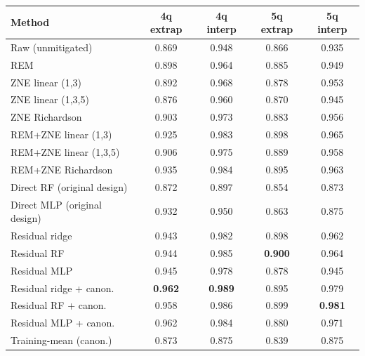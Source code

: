 \begin{tabular}{lcccc}
\toprule
Method & 4q extrap & 4q interp & 5q extrap & 5q interp \\
\midrule
Raw (unmitigated) & 0.869 & 0.948 & 0.866 & 0.935 \\
REM & 0.898 & 0.964 & 0.885 & 0.949 \\
ZNE linear (1,3) & 0.892 & 0.968 & 0.878 & 0.953 \\
ZNE linear (1,3,5) & 0.876 & 0.960 & 0.870 & 0.945 \\
ZNE Richardson & 0.903 & 0.973 & 0.883 & 0.956 \\
REM+ZNE linear (1,3) & 0.925 & 0.983 & 0.898 & 0.965 \\
REM+ZNE linear (1,3,5) & 0.906 & 0.975 & 0.889 & 0.958 \\
REM+ZNE Richardson & 0.935 & 0.984 & 0.895 & 0.963 \\
\midrule

Direct RF (original design) & 0.872 & 0.897 & 0.854 & 0.873 \\
Direct MLP (original design) & 0.932 & 0.950 & 0.863 & 0.875 \\
Residual ridge & 0.943 & 0.982 & 0.898 & 0.962 \\
Residual RF & 0.944 & 0.985 & \textbf{0.900} & 0.964 \\
Residual MLP & 0.945 & 0.978 & 0.878 & 0.945 \\
Residual ridge + canon. & \textbf{0.962} & \textbf{0.989} & 0.895 & 0.979 \\
Residual RF + canon. & 0.958 & 0.986 & 0.899 & \textbf{0.981} \\
Residual MLP + canon. & 0.962 & 0.984 & 0.880 & 0.971 \\
Training-mean (canon.) & 0.873 & 0.875 & 0.839 & 0.875 \\
\midrule

\bottomrule
\end{tabular}